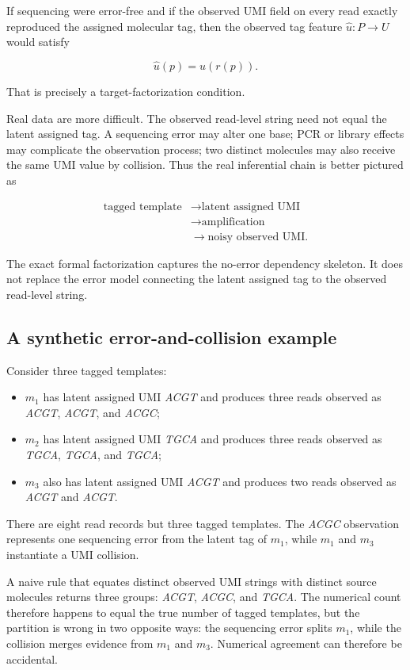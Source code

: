\documentclass[11pt]{article}
\begin{document}
If sequencing were error-free and if the observed UMI field on every read exactly reproduced the assigned molecular tag, then the observed tag feature \(\widehat u:P\to U\) would satisfy

\[
\widehat u(p)=u(r(p)).
\]

That is precisely a target-factorization condition.

Real data are more difficult. The observed read-level string need not equal the latent assigned tag. A sequencing error may alter one base; PCR or library effects may complicate the observation process; two distinct molecules may also receive the same UMI value by collision. Thus the real inferential chain is better pictured as

\[
\begin{aligned}
\text{tagged template}
&\to \text{latent assigned UMI}\\
&\to \text{amplification}\\
&\to \text{noisy observed UMI}.
\end{aligned}
\]

The exact formal factorization captures the no-error dependency skeleton. It does not replace the error model connecting the latent assigned tag to the observed read-level string.

\subsection{A synthetic error-and-collision example}

Consider three tagged templates:

\begin{itemize}[leftmargin=*]
\item \(m_1\) has latent assigned UMI \emph{ACGT} and produces three reads observed as \emph{ACGT}, \emph{ACGT}, and \emph{ACGC};
\item \(m_2\) has latent assigned UMI \emph{TGCA} and produces three reads observed as \emph{TGCA}, \emph{TGCA}, and \emph{TGCA};
\item \(m_3\) also has latent assigned UMI \emph{ACGT} and produces two reads observed as \emph{ACGT} and \emph{ACGT}.
\end{itemize}

There are eight read records but three tagged templates. The \emph{ACGC} observation represents one sequencing error from the latent tag of \(m_1\), while \(m_1\) and \(m_3\) instantiate a UMI collision.

A naive rule that equates distinct observed UMI strings with distinct source molecules returns three groups: \emph{ACGT}, \emph{ACGC}, and \emph{TGCA}. The numerical count therefore happens to equal the true number of tagged templates, but the partition is wrong in two opposite ways: the sequencing error splits \(m_1\), while the collision merges evidence from \(m_1\) and \(m_3\). Numerical agreement can therefore be accidental.
\end{document}
